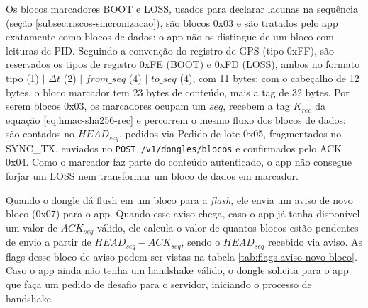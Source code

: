 \documentclass[
	12pt,
	article,			%
	oneside,
	a4paper,
	english,
	brazil				%
	]{abntex2}
\begin{document}
Os blocos marcadores BOOT e LOSS, usados para declarar lacunas na sequência (seção \ref{subsec:riscos-sincronizacao}), são blocos 0x03 e são tratados pelo app exatamente como blocos de dados: o app
não os distingue de um bloco com leituras de PID. Seguindo a convenção do registro de GPS (tipo 0xFF), são reservados os tipos de registro 0xFE (BOOT) e 0xFD (LOSS), ambos no formato tipo (1) $\mid$
$\Delta t$ (2) $\mid$ $from\_seq$ (4) $\mid$ $to\_seq$ (4), com 11 bytes; com o cabeçalho de 12 bytes, o bloco marcador tem 23 bytes de conteúdo, mais a tag de 32 bytes. Por serem blocos 0x03, os
marcadores ocupam um $seq$, recebem a tag $K_{rec}$ da equação \ref{eq:hmac-sha256-rec} e percorrem o mesmo fluxo dos blocos de dados: são contados no $HEAD_{seq}$, pedidos via Pedido de lote 0x05,
fragmentados no SYNC\_TX, enviados no \texttt{POST /v1/dongles/blocos} e confirmados pelo ACK 0x04. Como o marcador faz parte do conteúdo autenticado, o app não consegue forjar um LOSS nem
transformar um bloco de dados em marcador.

Quando o dongle dá flush em um bloco para a \textit{flash}, ele envia um aviso de novo bloco (0x07) para o app. Quando esse aviso chega, caso o app já tenha disponível um valor de $ACK_{seq}$ válido, 
ele calcula o valor de quantos blocos estão pendentes de envio a partir de $HEAD_{seq} - ACK_{seq}$, sendo o $HEAD_{seq}$ recebido via aviso. As flags desse bloco de aviso podem ser vistas na tabela
\ref{tab:flags-aviso-novo-bloco}. Caso o app ainda não tenha um handshake válido, o dongle solicita para o app que faça um pedido de desafio para o servidor, iniciando o processo de handshake.
\end{document}
